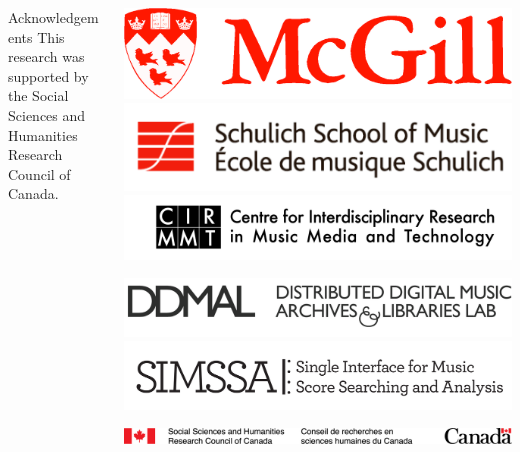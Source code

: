 \documentclass[final]{beamer}
\newlength{\onecolwid}
\begin{document}
\begin{frame}[fragile,t]
\begin{columns}
\begin{column}{\onecolwid}
\begin{block}{Acknowledgements}     
This research was supported by the Social Sciences and Humanities Research Council of Canada.
\end{block}

\end{column}
\begin{column}{\onecolwid}
\begin{block}{}
\vspace{-2cm}
\centering
\includegraphics[scale=0.2625]{images/McGill_logo}
\hspace{1.2cm} 
\includegraphics[scale=0.75]{images/Schulich_logo}
\hspace{1.2cm} 
\includegraphics[scale=0.2625]{images/CIRMMT_logo}

\centering
\includegraphics[scale=0.36]{images/ddmal_logo_large}
\includegraphics[scale=1]{images/SIMSSA_logo}

\includegraphics[width=\onecolwid]{images/SSHRC_logo}
\end{block}
\end{column}
\end{columns}

\end{frame}
\end{document}
